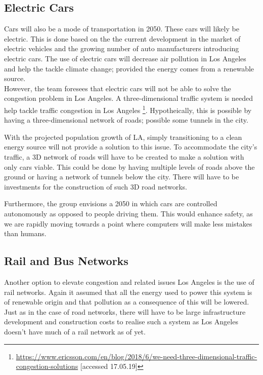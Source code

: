 \subsection{Electric Cars}
Cars will also be a mode of transportation in 2050. These cars will likely be electric. This is done based on the the current development in the market of electric vehicles and the growing number of auto manufacturers introducing electric cars. The use of electric cars will decrease air pollution in Los Angeles and help the tackle climate change; provided the energy comes from a renewable source. \\
However, the team foresees that electric cars will not be able to solve the congestion problem in Los Angeles. A three-dimensional traffic system is needed help tackle traffic congestion in Los Angeles \footnote{\url{https://www.ericsson.com/en/blog/2018/6/we-need-three-dimensional-traffic-congestion-solutions} [accessed 17.05.19]}. Hypotheically, this is possible by having a three-dimensional network of roads; possible some tunnels in the city.   




With the projected population growth of LA, simply transitioning to a clean energy source will not provide a solution to this issue. To accommodate the city's traffic, a 3D network of roads will have to be created to make a solution with only cars viable. This could be done by having multiple levels of roads above the ground or having a network of tunnels below the city. There will have to be investments for the construction of such 3D road networks. 

Furthermore, the group envisions a 2050 in which cars are controlled autonomously as opposed to people driving them. This would enhance safety, as we are rapidly moving towards a point where computers will make less mistakes than humans.

\subsection{Rail and Bus Networks}
Another option to elevate congestion and related issues Los Angeles is the use of rail networks. Again it assumed that all the energy used to power this system is of renewable origin and that pollution as a consequence of this will be lowered. Just as in the case of road networks, there will have to be large infrastructure development and construction costs to realise such a system as Los Angeles doesn't have much of a rail network as of yet. 

